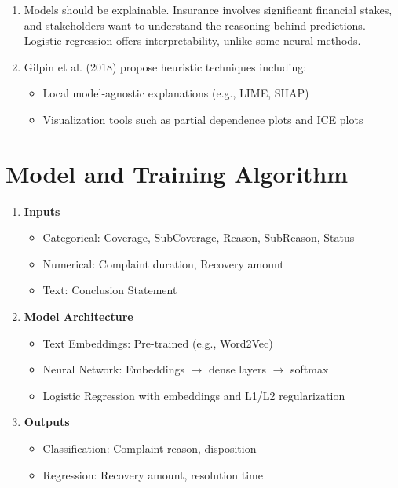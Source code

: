 \documentclass[final]{article}
\begin{document}
\begin{enumerate}
  \item Models should be explainable. Insurance involves significant financial stakes, and stakeholders want to understand the reasoning behind predictions. Logistic regression offers interpretability, unlike some neural methods.
  \item Gilpin et al. (2018) propose heuristic techniques including: 
  \begin{itemize}
    \item Local model-agnostic explanations (e.g., LIME, SHAP)
    \item Visualization tools such as partial dependence plots and ICE plots
  \end{itemize}
\end{enumerate}

\section{Model and Training Algorithm}

\begin{enumerate}
  \item \textbf{Inputs}
    \begin{itemize}
      \item Categorical: Coverage, SubCoverage, Reason, SubReason, Status
      \item Numerical: Complaint duration, Recovery amount
      \item Text: Conclusion Statement
    \end{itemize}
  \item \textbf{Model Architecture}
    \begin{itemize}
      \item Text Embeddings: Pre-trained (e.g., Word2Vec)
      \item Neural Network: Embeddings $\rightarrow$ dense layers $\rightarrow$ softmax
      \item Logistic Regression with embeddings and L1/L2 regularization
    \end{itemize}
  \item \textbf{Outputs}
    \begin{itemize}
      \item Classification: Complaint reason, disposition
      \item Regression: Recovery amount, resolution time
    \end{itemize}
\end{enumerate}
\end{document}
